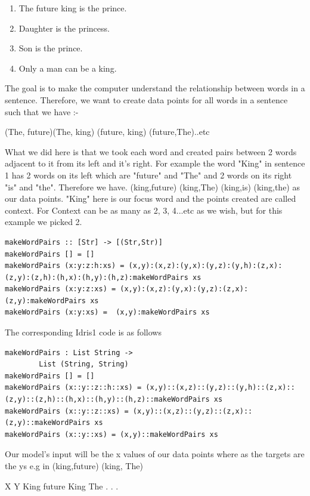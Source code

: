 \documentclass[]{report}
\begin{document}
\begin{enumerate}
    \item The future king is the prince.
    \item Daughter is the princess.
    \item Son is the prince.
    \item Only a man can be a king. 
\end{enumerate}

The goal is to make the computer understand the relationship between words in a sentence. 
Therefore, we want to create data points for all words in a sentence such that we have :-

(The, future)(The, king) (future, king) (future,The)..etc 

What we did here is that we took each word and created pairs between 2 words adjacent 
to it from its left and it's right. For example the word "King" in sentence 1 has 2 words 
on its left which are "future" and "The" and 2 words on its right "is" and "the". Therefore we have.  
(king,future) (king,The) (king,is) (king,the) as our data points. "King" here is our focus word and the points created are called context. For
Context can be as many as 2, 3, 4...etc as we wish, but for this example we picked 2.

\begin{verbatim}
makeWordPairs :: [Str] -> [(Str,Str)]
makeWordPairs [] = []
makeWordPairs (x:y:z:h:xs) = (x,y):(x,z):(y,x):(y,z):(y,h):(z,x):(z,y):(z,h):(h,x):(h,y):(h,z):makeWordPairs xs
makeWordPairs (x:y:z:xs) = (x,y):(x,z):(y,x):(y,z):(z,x):(z,y):makeWordPairs xs
makeWordPairs (x:y:xs) =  (x,y):makeWordPairs xs
\end{verbatim}


The corresponding Idris1 code is as follows 
\begin{verbatim}
makeWordPairs : List String -> 
		List (String, String)
makeWordPairs [] = []
makeWordPairs (x::y::z::h::xs) = (x,y)::(x,z)::(y,z)::(y,h)::(z,x)::(z,y)::(z,h)::(h,x)::(h,y)::(h,z)::makeWordPairs xs
makeWordPairs (x::y::z::xs) = (x,y)::(x,z)::(y,z)::(z,x)::(z,y)::makeWordPairs xs
makeWordPairs (x::y::xs) = (x,y)::makeWordPairs xs

\end{verbatim}

Our model’s input will be the x values of our data points where as the targets are the ys e.g in (king,future) (king, The)

X       Y   
King    future
King    The
.
.
.
\end{document}
